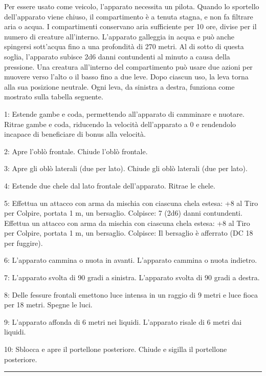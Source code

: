 \begin{multicols}{2}
Per essere usato come veicolo, l'apparato necessita un pilota. Quando lo sportello dell'apparato viene chiuso, il compartimento è a tenuta stagna, e non fa filtrare aria o acqua. I compartimenti conservano aria sufficiente per 10 ore, divise per il numero di creature all'interno. L'apparato galleggia in acqua e può anche spingersi sott'acqua fino a una profondità di 270 metri. Al di sotto di questa soglia, l'apparato subisce 2d6 danni contundenti al minuto a causa della pressione. Una creatura all'interno del compartimento può usare due azioni per muovere verso l'alto o il basso fino a due leve. Dopo ciascun uso, la leva torna alla sua posizione neutrale. Ogni leva, da sinistra a destra, funziona come mostrato sulla tabella seguente.

1: Estende gambe e coda, permettendo all'apparato di camminare e nuotare. Ritrae gambe e coda, riducendo la velocità dell'apparato a 0 e rendendolo incapace di beneficiare di bonus alla velocità.

2: Apre l'oblò frontale. Chiude l'oblò frontale.

3: Apre gli oblò laterali (due per lato). Chiude gli oblò laterali (due per lato).

4: Estende due chele dal lato frontale dell'apparato. Ritrae le chele.

5: Effettua un attacco con arma da mischia con ciascuna chela estesa: +8 al Tiro per Colpire, portata 1 m, un bersaglio. Colpisce: 7 (2d6) danni contundenti. Effettua un attacco con arma da mischia con ciascuna chela estesa: +8 al Tiro per Colpire, portata 1 m, un bersaglio. Colpisce: Il bersaglio è afferrato (DC 18 per fuggire).

6: L'apparato cammina o nuota in avanti. L'apparato cammina o nuota indietro.

7: L'apparato svolta di 90 gradi a sinistra. L'apparato svolta di 90 gradi a destra.

8: Delle fessure frontali emettono luce intensa in un raggio di 9 metri e luce fioca per 18 metri. Spegne le luci.

9: L'apparato affonda di 6 metri nei liquidi. L'apparato risale di 6 metri dai liquidi.

10: Sblocca e apre il portellone posteriore. Chiude e sigilla il portellone posteriore.

\smallskip\noindent\rule{\linewidth}{2pt}  \hypertarget{Ariete}{}\smallskip{}\noindent\label{Ariete}


\end{multicols}
